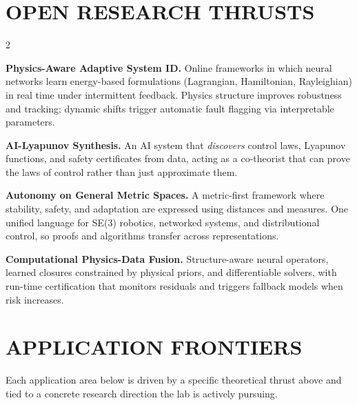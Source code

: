 \documentclass[9pt, letterpaper]{article}
\begin{document}
\section{OPEN RESEARCH THRUSTS}

\begin{multicols}{2}\small

\textbf{Physics-Aware Adaptive System ID.}
Online frameworks in which neural networks learn energy-based formulations
(Lagrangian, Hamiltonian, Rayleighian) in real time under intermittent feedback.
Physics structure improves robustness and tracking; dynamic shifts trigger
automatic fault flagging via interpretable parameters.

\textbf{AI-Lyapunov Synthesis.}
An AI system that \textit{discovers} control laws, Lyapunov functions, and safety
certificates from data, acting as a co-theorist that can prove the laws of
control rather than just approximate them.

\columnbreak

\textbf{Autonomy on General Metric Spaces.}
A metric-first framework where stability, safety, and adaptation are expressed using
distances and measures.
One unified language for SE(3) robotics, networked systems, and distributional
control, so proofs and algorithms transfer across representations.

\textbf{Computational Physics-Data Fusion.}
Structure-aware neural operators, learned closures constrained by physical priors,
and differentiable solvers, with run-time certification that monitors residuals and
triggers fallback models when risk increases.

\end{multicols}

\section{APPLICATION FRONTIERS}

Each application area below is driven by a specific theoretical thrust above and
tied to a concrete research direction the lab is actively pursuing.
\end{document}
